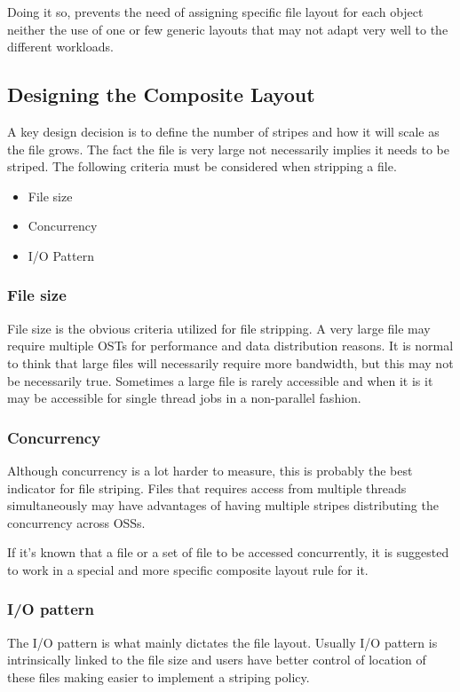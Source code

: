 \documentclass{article}
\begin{document}
Doing it so, prevents the need of assigning specific file layout for each object neither the use of one or few generic layouts that may not adapt very well to the different workloads.

\subsection{Designing the Composite Layout}
A key design decision is to define the number of stripes and how it will scale as the file grows. The fact the file is very large not necessarily implies it needs to be striped. The following criteria must be considered when stripping a file.
\begin{itemize}
    \item File size
    \item Concurrency
    \item I/O Pattern
\end{itemize}

\subsubsection{File size}
File size is the obvious criteria utilized for file stripping. A very large file may require multiple OSTs for performance and data distribution reasons. It is normal to think that large files will necessarily require more bandwidth, but this may not be necessarily true. Sometimes a large file is rarely accessible and when it is it may be accessible for single thread jobs in a non-parallel fashion.

\subsubsection{Concurrency}
Although concurrency is a lot harder to measure, this is probably the best indicator for file striping. Files that requires access from multiple threads simultaneously may have advantages of having multiple stripes distributing the concurrency across OSSs. 

If it's known that a file or a set of file to be accessed concurrently, it is suggested to work in a special and more specific composite layout rule for it. 

\subsubsection{I/O pattern}
The I/O pattern is what mainly dictates the file layout. Usually I/O pattern is intrinsically linked to the file size and users have better control of location of these files making easier to implement a striping policy. 
\end{document}
